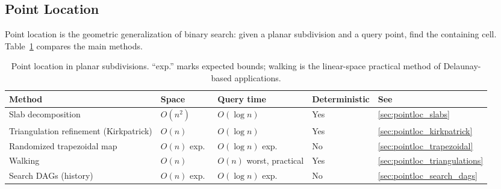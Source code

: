 \subsection{Point Location}
\label{sec:appalgs_bsearch_pointloc}

Point location is the geometric generalization of binary search: given a
planar subdivision and a query point, find the containing cell.
Table~\ref{tbl:appalgs_pointloc} compares the main methods.

\begin{table}[htbp]
\centering
\begin{tabular}{lllll}
\toprule
Method & Space & Query time & Deterministic & See \\
\midrule
Slab decomposition  & $O(n^2)$ & $O(\log n)$ & Yes & \ref{sec:pointloc_slabs} \\
Triangulation refinement (Kirkpatrick) & $O(n)$ & $O(\log n)$ & Yes & \ref{sec:pointloc_kirkpatrick} \\
Randomized trapezoidal map & $O(n)$ exp.\ & $O(\log n)$ exp.\ & No & \ref{sec:pointloc_trapezoidal} \\
Walking             & $O(n)$ & $O(n)$ worst, practical & Yes & \ref{sec:pointloc_triangulations} \\
Search DAGs (history) & $O(n)$ exp.\ & $O(\log n)$ exp.\ & No & \ref{sec:pointloc_search_dags} \\
\bottomrule
\end{tabular}
\caption{Point location in planar subdivisions. ``exp.'' marks expected
bounds; walking is the linear-space practical method of Delaunay-based
applications.}
\label{tbl:appalgs_pointloc}
\end{table}

